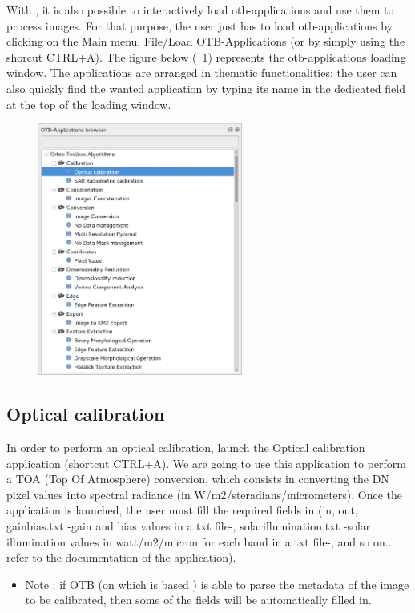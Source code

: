 With \mont, it is also possible to interactively load otb-applications and use them to process images.
For that purpose, the user just has to load otb-applications by clicking on the Main menu, File/Load OTB-Applications (or by simply using the shorcut CTRL+A).
The figure below (~\ref{fig:applications}) represents the otb-applications loading window. The applications are arranged in thematic functionalities; the user can also quickly find the wanted application by typing its name in the dedicated field
at the top of the loading window.


\begin{figure}[!h] 
  \center
  \includegraphics[width=0.6\textwidth]{../Art/MonteverdiImages/applications.png}
  \label{fig:applications}
\end{figure}


\subsection{Optical calibration}\label{ssec:monoptical}

In order to perform an optical calibration, launch the Optical calibration application (shortcut CTRL+A). 
We are going to use this application to perform a TOA (Top Of Atmosphere) conversion, which consists in converting the DN pixel values into spectral radiance (in W/m2/steradians/micrometers).
Once the application is launched, the user must fill the required fields in
(in, out, gainbias.txt -gain and bias values in a txt file-, solarillumination.txt -solar illumination values in watt/m2/micron for each band in a txt file-, and so on... refer to the documentation of the application).
\begin{itemize}
\item Note : if OTB (on which is based \mont) is able to parse the metadata of the image to be calibrated, then some of the fields will be automatically filled in.
\end{itemize}

